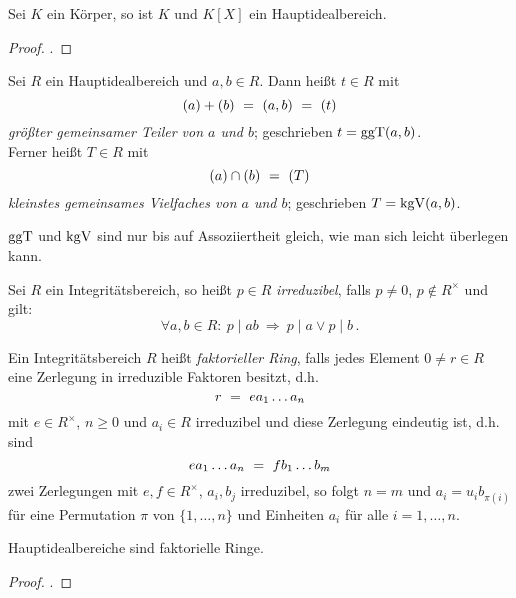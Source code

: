 \begin{lemma}
  Sei $K$ ein Körper, so ist $K$ und $K[X]$ ein Hauptidealbereich.
\end{lemma}
\begin{proof}
  \autocite[Satz 17.6]{karpfinger2010algebra}.
\end{proof}

\begin{definition}
  Sei $R$ ein Hauptidealbereich und $a,b \in R$. Dann heißt $t\in R$ mit 
  \[ (a)+(b) \ =\  (a,b) \ =\  (t)\]
  \emph{größter gemeinsamer Teiler von $a$ und $b$}; 
  geschrieben $t=\operatorname{ggT}(a,b)$.\\
  Ferner heißt $T\in R$ mit 
  \[ (a)\cap (b) \ =\  (T)\]
  \emph{kleinstes gemeinsames Vielfaches von $a$ und $b$};
  geschrieben $T = \operatorname{kgV}(a,b)$.
\end{definition}


\begin{bemerkung}
  $\operatorname{ggT}$ und $\operatorname{kgV}$ sind nur bis auf Assoziiertheit gleich, wie man sich leicht
  überlegen kann.
\end{bemerkung}

\begin{definition}
  Sei $R$ ein Integritätsbereich, so heißt $p\in R$ 
  \emph{irreduzibel}, falls $p\neq 0$, $p\notin R^\times$ und
  gilt:
  \[ \forall a,b \in R:\ p \mid ab \ \Rightarrow\ 
    p\mid a \lor p\mid b\,.\]
\end{definition}

\begin{definition}
  Ein Integritätsbereich $R$ heißt \emph{faktorieller Ring}, falls jedes
  Element $0\neq r \in R$ eine Zerlegung in irreduzible Faktoren besitzt, d.h.
  \[ r \ =\  e a_1 \ldots a_n\]
  mit $e \in R^\times$, $n\geq 0$ und $a_i\in R$ irreduzibel und diese
  Zerlegung eindeutig ist, d.h.  sind 
  \[ e a_1 \ldots a_n \ =\  f b_1 \ldots b_m \]
  zwei Zerlegungen mit $e, f\in R^\times$, $a_i,b_j$ irreduzibel, so
  folgt $n = m$ und $a_i = u_i b_{\pi(i)}$ für eine Permutation
  $\pi$ von $\{1,\ldots,n\}$ und Einheiten $a_i$ für alle $i=1,\ldots,n$.
\end{definition}

\begin{satz}
  \label{satz:hid_sind_faktoriell}
  Hauptidealbereiche sind faktorielle Ringe.
\end{satz}
\begin{proof}
  \autocite[Theorem II.5.2]{lang2002algebra}.
\end{proof}

